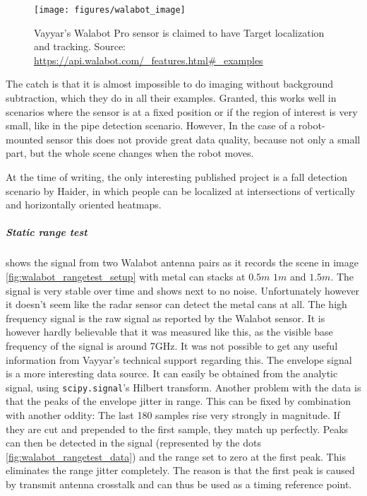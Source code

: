 \begin{figure}[htbp]
    \centering
    \texttt{[image: figures/walabot\_image]}
    \caption{Vayyar's Walabot Pro sensor is claimed to have Target localization and tracking. Source: \url{https://api.walabot.com/\_features.html\#\_examples}}
    \label{fig:walabot_image}
\end{figure}

The catch is that it is almost impossible to do imaging without background subtraction, which they do in all their examples. Granted, this works well in scenarios where the sensor is at a fixed position or if the region of interest is very small, like in the pipe detection scenario. However, In the case of a robot-mounted sensor this does not provide great data quality, because not only a small part, but the whole scene changes when the robot moves.

At the time of writing, the only interesting published project is a fall detection scenario \cite{Haider2017} by Haider, in which people can be localized at intersections of vertically and horizontally oriented heatmaps.

\subparagraph{Static range test}\label{static-range-test}

 shows the signal from two Walabot antenna pairs as it records the scene in image \cref{fig:walabot_rangetest_setup} with metal can stacks at \(0.5m\) \(1m\) and \(1.5m\). The signal is very stable over time and shows next to no noise. Unfortunately however it doesn't seem like the radar sensor can detect the metal cans at all. The high frequency signal is the raw signal as reported by the Walabot sensor. It is however hardly believable that it was measured like this, as the visible base frequency of the signal is around 7GHz. It was not possible to get any useful information from Vayyar's technical support regarding this. The envelope signal is a more interesting data source. It can easily be obtained from the analytic signal, using \texttt{scipy.signal}'s Hilbert transform.
Another problem with the data is that the peaks of the envelope jitter
in range. This can be fixed by combination with another oddity: The last
180 samples rise very strongly in magnitude. If they are cut and
prepended to the first sample, they match up perfectly. Peaks can then
be detected in the signal (represented by the dots \cref{fig:walabot_rangetest_data}) and
the range set to zero at the first peak. This eliminates the range
jitter completely. The reason is that the first peak is caused by
transmit antenna crosstalk and can thus be used as a timing reference
point.

